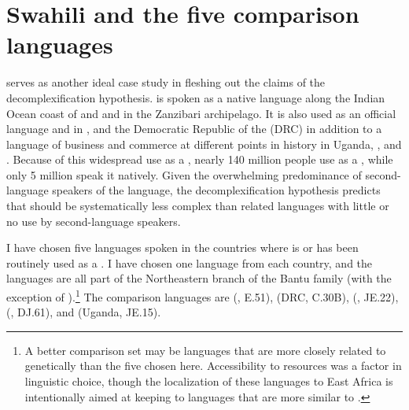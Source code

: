 \documentclass[output=paper,
modfonts
]{langscibook}
\begin{document}
\largerpage[-1]
\section{Swahili and the five comparison languages}\label{sec:3:jerro}

 serves as another ideal case study in fleshing out the claims of the decomplexification hypothesis.  is spoken as a native language along the Indian Ocean coast of  and  and in the Zanzibari archipelago. It is also used as an official language and  in ,  and the Democratic Republic of the  (DRC) in addition to a language of business and commerce at different points in history in Uganda, , and . Because of this widespread use as a , nearly 140 million people use  as a , while only 5 million speak it natively.  Given the overwhelming predominance of second-language speakers of the language, the decomplexification hypothesis predicts that  should be systematically less complex than related languages with little or no use by second-language speakers. 

 
  I have chosen five languages spoken in the countries where  is or has been routinely used as a . 
I have chosen one language from each country, and the languages are all part of the Northeastern branch of the Bantu family (with the exception of ).\footnote{A better comparison set may be languages that are more closely related to  genetically than the five chosen here. Accessibility to resources was a  factor in linguistic choice, though the localization of these languages to East Africa is intentionally aimed at keeping to languages that are more similar to .} The comparison languages are  (, E.51),  (DRC, C.30B),  (, JE.22),  (, DJ.61), and  (Uganda, JE.15).
  
	 
	
\end{document}
